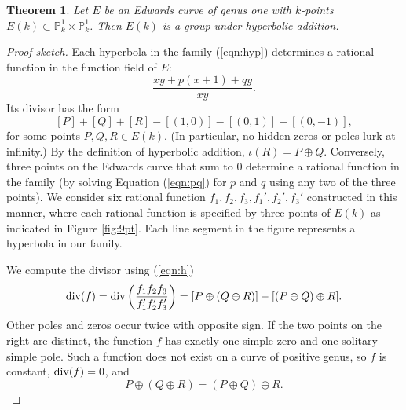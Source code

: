 \documentclass[12pt]{article}
\newtheorem{theorem}{Theorem}[subsection]
\newcommand{\ring}[1]{\mathbb{#1}}
\newcommand{\op}[1]{\hbox{#1}}
\begin{document}
\begin{theorem} Let $E$ be an Edwards curve of genus one with
  $k$-points $E(k)\subset \ring{P}_k^1\times \ring{P}_k^1$.  Then
  $E(k)$ is a group under hyperbolic addition.
\end{theorem}

\begin{proof}[Proof sketch] 
  Each hyperbola in the family (\ref{eqn:hyp}) determines a rational
  function in the function field of $E$:
\[
\frac{x y + p (x+1) + q y}{x y}.
\]
Its divisor has the form
\begin{equation}\label{eqn:h}
[P] + [Q] + [R] - [(1,0)] - [(0,1)] - [(0,-1)],
\end{equation}
for some points $P,Q,R\in E(k)$.  (In particular, no hidden zeros or
poles lurk at infinity.)  By the definition of hyperbolic addition,
$\iota(R) = P\oplus Q$.  Conversely, three points on the Edwards curve
that sum to $0$ determine a rational function in the family (by
solving Equation (\ref{eqn:pq}) for $p$ and $q$ using any two of the
three points). We consider six rational function
$f_1,f_2,f_3,f_1',f_2',f_3'$ constructed in this manner, where each
rational function is specified by three points of $E(k)$ as indicated
in Figure {\ref{fig:9pt}}.  Each line segment in the figure represents
a hyperbola in our family.

We compute the divisor using (\ref{eqn:h})
\[
\op{div} (f) =\op{div}\left(\frac{f_1 f_2 f_3}{f_1' f_2' f_3'}\right) = 
[P\oplus (Q\oplus R)] - [(P\oplus Q) \oplus R].
\]
Other poles and zeros occur twice with opposite sign.
If the two points on the right are distinct, the function $f$ has exactly one
simple zero and one solitary simple pole.  Such a function does not
exist on a curve of positive genus, so $f$ is constant, $\op{div}(f)=0$, and
\[
P\oplus (Q\oplus R) = (P\oplus Q) \oplus R.
\]
\end{proof}
\end{document}
